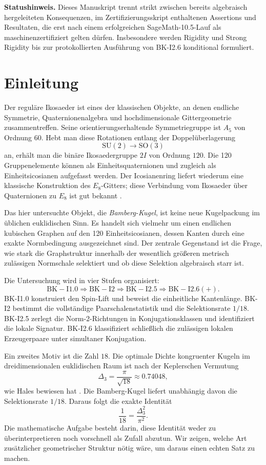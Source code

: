 \documentclass[11pt,a4paper]{article}
\theoremstyle{definition}
\newcommand{\twoI}{2I}
\begin{document}
\textbf{Statushinweis.}
Dieses Manuskript trennt strikt zwischen bereits algebraisch hergeleiteten Konsequenzen, im Zertifizierungsskript enthaltenen Assertions und Resultaten, die erst nach einem erfolgreichen SageMath-10.5-Lauf als maschinenzertifiziert gelten dürfen. Insbesondere werden Rigidity und Strong Rigidity bis zur protokollierten Ausführung von BK-I2.6 konditional formuliert.

\section{Einleitung}

Der reguläre Ikosaeder ist eines der klassischen Objekte, an denen endliche Symmetrie, Quaternionenalgebra und hochdimensionale Gittergeometrie zusammentreffen. Seine orientierungserhaltende Symmetriegruppe ist \(A_5\) von Ordnung \(60\). Hebt man diese Rotationen entlang der Doppelüberlagerung
\[
\mathrm{SU}(2)\longrightarrow \mathrm{SO}(3)
\]
an, erhält man die binäre Ikosaedergruppe \(\twoI\) von Ordnung \(120\). Die 120 Gruppenelemente können als Einheitsquaternionen und zugleich als Einheitsicosianen aufgefasst werden. Der Icosianenring liefert wiederum eine klassische Konstruktion des \(E_8\)-Gitters; diese Verbindung vom Ikosaeder über Quaternionen zu \(E_8\) ist gut bekannt \cite{Baez2018}.

Das hier untersuchte Objekt, die \emph{Bamberg-Kugel}, ist keine neue Kugelpackung im üblichen euklidischen Sinn. Es handelt sich vielmehr um einen endlichen kubischen Graphen auf den 120 Einheitsicosianen, dessen Kanten durch eine exakte Normbedingung ausgezeichnet sind. Der zentrale Gegenstand ist die Frage, wie stark die Graphstruktur innerhalb der wesentlich größeren metrisch zulässigen Normschale selektiert und ob diese Selektion algebraisch starr ist.

Die Untersuchung wird in vier Stufen organisiert:
\[
\boxed{
\mathrm{BK\!-\!I1.0}
\Longrightarrow
\mathrm{BK\!-\!I2}
\Longrightarrow
\mathrm{BK\!-\!I2.5}
\Longrightarrow
\mathrm{BK\!-\!I2.6(+)}.
}
\]
BK-I1.0 konstruiert den Spin-Lift und beweist die einheitliche Kantenlänge. BK-I2 bestimmt die vollständige Paarschalenstatistik und die Selektionsrate \(1/18\). BK-I2.5 zerlegt die Norm-\(2\)-Richtungen in Konjugationsklassen und identifiziert die lokale Signatur. BK-I2.6 klassifiziert schließlich die zulässigen lokalen Erzeugerpaare unter simultaner Konjugation.

Ein zweites Motiv ist die Zahl \(18\). Die optimale Dichte kongruenter Kugeln im dreidimensionalen euklidischen Raum ist nach der Keplerschen Vermutung
\[
\Delta_3=\frac{\pi}{\sqrt{18}}\approx0.74048,
\]
wie Hales bewiesen hat \cite{Hales2005}. Die Bamberg-Kugel liefert unabhängig davon die Selektionsrate \(1/18\). Daraus folgt die exakte Identität
\[
\frac1{18}=\frac{\Delta_3^2}{\pi^2}.
\]
Die mathematische Aufgabe besteht darin, diese Identität weder zu überinterpretieren noch vorschnell als Zufall abzutun. Wir zeigen, welche Art zusätzlicher geometrischer Struktur nötig wäre, um daraus einen echten Satz zu machen.
\end{document}
